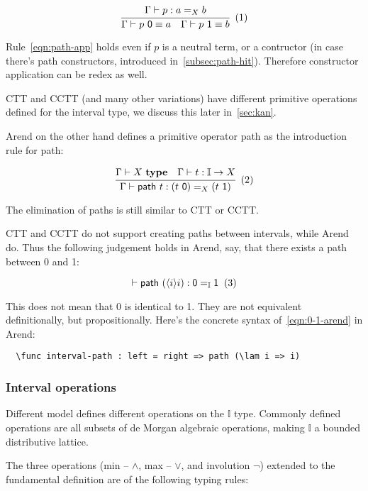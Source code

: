 \[
  \cfrac{
    \Gamma \vdash p : a =_X b
  }{
    \Gamma \vdash p\ \textsf 0 \equiv a
    \quad
    \Gamma \vdash p\ \textsf 1 \equiv b
  }
  \xtag \label{eqn:path-app}
\]

Rule~\ref{eqn:path-app} holds even if $p$ is a neutral term,
or a contructor (in case there's path constructors,
introduced in~\cref{subsec:path-hit}).
Therefore constructor application can be redex as well.

CTT and CCTT (and many other variations) have different primitive
operations defined for the interval type,
we discuss this later in~\cref{sec:kan}.

Arend on the other hand defines a primitive operator \textsf{path}
as the introduction rule for path:

\[
  \cfrac{
    \Gamma \vdash X \ \textbf{type}
    \quad
    \Gamma \vdash t : \mathbb I \rightarrow X
  }{
    \Gamma \vdash \textsf{path} \ t : (t \ \textsf 0) =_X (t \ \textsf 1)
  }
  \xtag
\]

The elimination of paths is still similar to CTT or CCTT.

CTT and CCTT do not support creating paths between intervals,
while Arend do.
Thus the following judgement holds in Arend, say,
that there exists a path between \textsf 0 and \textsf 1:

\[
  \vdash \textsf{path}\ (\lrangle i i) : \textsf 0 =_{\mathbb I} \textsf 1
  \xtag \label{eqn:0-1-arend}
\]

This does not mean that \textsf 0 is identical to \textsf 1.
They are not equivalent definitionally, but propositionally.
Here's the concrete syntax of~\ref{eqn:0-1-arend} in Arend:

\begin{verbatim}
  \func interval-path : left = right => path (\lam i => i)
\end{verbatim}

\subsubsection{Interval operations}

Different model defines different operations on the $\mathbb I$ type.
Commonly defined operations are all subsets of de Morgan algebraic operations,
making $\mathbb I$ a bounded distributive lattice.

The three operations (min -- $\wedge$, max -- $\vee$, and involution $\neg$)
extended to the fundamental definition are of the following typing rules:

